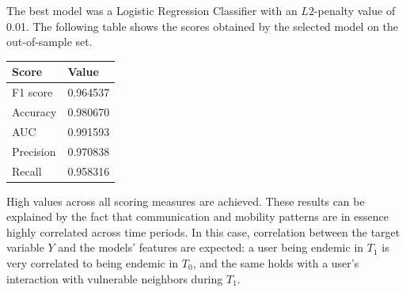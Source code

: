 The best model was a Logistic Regression Classifier with an $L2$-penalty value of 0.01. 
The following table
shows the scores obtained by the selected model on the out-of-sample set.

\begin{center}
\begin{tabular}{ l l }
\toprule
Score & Value \\
\midrule
F1 score  & 0.964537   \\
Accuracy  & 0.980670   \\
AUC       & 0.991593   \\
Precision & 0.970838   \\
Recall    & 0.958316   \\
\bottomrule
\end{tabular}
\end{center}



High values across all scoring measures are achieved. %
These results can be explained by the fact that 
communication and mobility patterns are in essence highly correlated across time periods. 
In this case, correlation between the target variable $Y$ and the models' features are expected:
a user being endemic in $T_1$ is very correlated to being endemic in $T_0$, and the same holds with a user's interaction with vulnerable neighbors during $T_1$.

